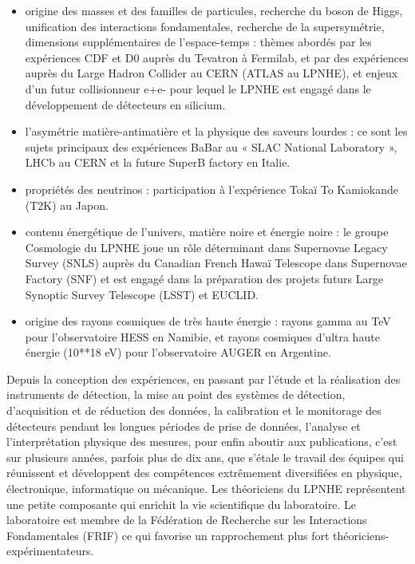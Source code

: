 \documentclass[french,a4paper,12pt]{report}
\begin{document}
  \begin{itemize}
  \item origine des masses et des familles de particules, recherche du boson de Higgs, unification des interactions fondamentales, recherche de la supersymétrie, dimensions supplémentaires de l’espace-temps : thèmes abordés par les expériences CDF et D0 auprès du Tevatron à Fermilab, et par des expériences auprès du Large Hadron Collider au CERN (ATLAS au LPNHE), et enjeux d’un futur collisionneur e+e- pour lequel le LPNHE est engagé dans le développement de détecteurs en silicium.
  
  \item l’asymétrie matière-antimatière et la physique des saveurs lourdes : ce sont les sujets principaux des expériences BaBar au « SLAC National Laboratory », LHCb au CERN et la future SuperB factory en Italie.
  
  \item propriétés des neutrinos : participation à l’expérience Tokaï To Kamiokande (T2K) au Japon.
  
  \item contenu énergétique de l’univers, matière noire et énergie noire : le groupe Cosmologie du LPNHE joue un rôle déterminant dans Supernovae Legacy Survey (SNLS) auprès du Canadian French Hawaï Telescope dans Supernovae Factory (SNF) et est engagé dans la préparation des projets futurs Large Synoptic Survey Telescope (LSST) et EUCLID.
  
  \item origine des rayons cosmiques de très haute énergie : rayons gamma au TeV pour l’observatoire HESS en Namibie, et rayons cosmiques d’ultra haute énergie (10**18 eV) pour l’observatoire AUGER en Argentine.
  \end{itemize}
  
  Depuis la conception des expériences, en passant par l’étude et la réalisation des instruments de détection, la mise au point des systèmes de détection, d’acquisition et de réduction des données, la calibration et le monitorage des détecteurs pendant les longues périodes de prise de données, l’analyse et l’interprétation physique des mesures, pour enfin aboutir aux publications, c’est sur plusieurs années, parfois plus de dix ans, que s’étale le travail des équipes qui réunissent et développent des compétences extrêmement diversifiées en physique, électronique, informatique ou mécanique. Les théoriciens du LPNHE représentent une petite composante qui enrichit la vie scientifique du laboratoire. Le laboratoire est membre de la Fédération de Recherche sur les Interactions Fondamentales (FRIF) ce qui favorise un rapprochement plus fort théoriciens-expérimentateurs.
  
\end{document}
